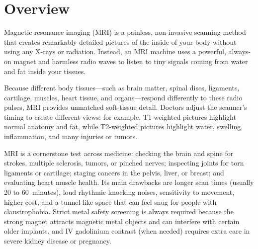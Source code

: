 \label{ch:infographic-mri}

\section{Overview}

Magnetic resonance imaging (MRI) is a painless, non-invasive scanning method that creates remarkably detailed pictures of the inside of your body without using any X-rays or radiation. Instead, an MRI machine uses a powerful, always-on magnet and harmless radio waves to listen to tiny signals coming from water and fat inside your tissues.

Because different body tissues---such as brain matter, spinal discs, ligaments, cartilage, muscles, heart tissue, and organs---respond differently to these radio pulses, MRI provides unmatched soft-tissue detail. Doctors adjust the scanner's timing to create different views: for example, T1-weighted pictures highlight normal anatomy and fat, while T2-weighted pictures highlight water, swelling, inflammation, and many injuries or tumors.

MRI is a cornerstone test across medicine: checking the brain and spine for strokes, multiple sclerosis, tumors, or pinched nerves; inspecting joints for torn ligaments or cartilage; staging cancers in the pelvis, liver, or breast; and evaluating heart muscle health. Its main drawbacks are longer scan times (usually 20 to 60~minutes), loud rhythmic knocking noises, sensitivity to movement, higher cost, and a tunnel-like space that can feel snug for people with claustrophobia. Strict metal safety screening is always required because the strong magnet attracts magnetic metal objects and can interfere with certain older implants, and IV gadolinium contrast (when needed) requires extra care in severe kidney disease or pregnancy.

